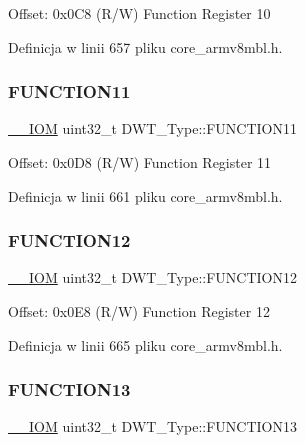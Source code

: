 Offset\+: 0x0\+C8 (R/W) Function Register 10 

Definicja w linii 657 pliku core\+\_\+armv8mbl.\+h.

\mbox{\label{struct_d_w_t___type_a214f7478184150e43175c05aecad6c96}} 
\subsubsection{\texorpdfstring{F\+U\+N\+C\+T\+I\+O\+N11}{FUNCTION11}}
{\footnotesize\ttfamily \hyperlink{core__sc300_8h_ab6caba5853a60a17e8e04499b52bf691}{\+\_\+\+\_\+\+I\+OM} uint32\+\_\+t D\+W\+T\+\_\+\+Type\+::\+F\+U\+N\+C\+T\+I\+O\+N11}

Offset\+: 0x0\+D8 (R/W) Function Register 11 

Definicja w linii 661 pliku core\+\_\+armv8mbl.\+h.

\mbox{\label{struct_d_w_t___type_a521771b3dfe2ea48463e1e91d01448b6}} 
\subsubsection{\texorpdfstring{F\+U\+N\+C\+T\+I\+O\+N12}{FUNCTION12}}
{\footnotesize\ttfamily \hyperlink{core__sc300_8h_ab6caba5853a60a17e8e04499b52bf691}{\+\_\+\+\_\+\+I\+OM} uint32\+\_\+t D\+W\+T\+\_\+\+Type\+::\+F\+U\+N\+C\+T\+I\+O\+N12}

Offset\+: 0x0\+E8 (R/W) Function Register 12 

Definicja w linii 665 pliku core\+\_\+armv8mbl.\+h.

\mbox{\label{struct_d_w_t___type_af9ea0b56769614c5c5699003b3df39f0}} 
\subsubsection{\texorpdfstring{F\+U\+N\+C\+T\+I\+O\+N13}{FUNCTION13}}
{\footnotesize\ttfamily \hyperlink{core__sc300_8h_ab6caba5853a60a17e8e04499b52bf691}{\+\_\+\+\_\+\+I\+OM} uint32\+\_\+t D\+W\+T\+\_\+\+Type\+::\+F\+U\+N\+C\+T\+I\+O\+N13}

